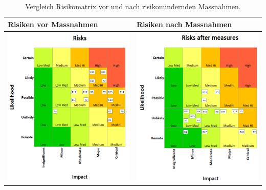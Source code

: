 \documentclass[../main.tex]{subfiles}
\begin{document}
\begin{landscape}
\begin{longtable}
\caption{Risikotabelle}
\label{tab:risikotabelle}

\end{longtable}
\normalsize    
\end{landscape}

\newpage
\begin{table}[H]
\centering
\begin{tabular}{|l|l|}
\hline
\textbf{Risiken vor Massnahmen} & \textbf{Risiken nach Massnahmen} \\ \hline
 \includegraphics[width=8cm]{img/Risikomatrix/Risks_before_measures_v2_pren1.png}        & \includegraphics[width=8cm]{img/Risikomatrix/Risks_after_measures_v2_pren1.png} \\ \hline
 
\end{tabular}
\caption{Vergleich Risikomatrix vor und nach risikomindernden Massnahmen.}
\label{tab:risikografik}
\end{table}
\end{document}

